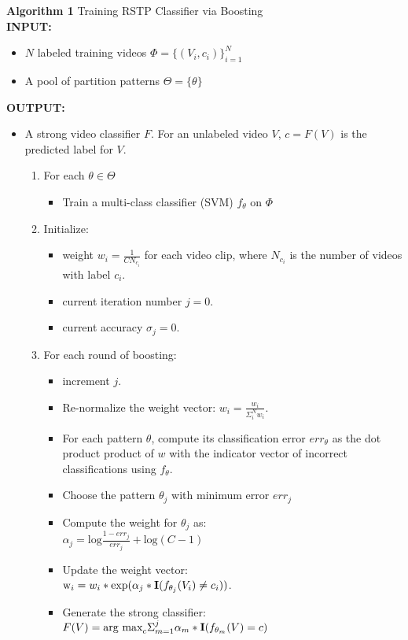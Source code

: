 \documentclass[10pt,twocolumn,letterpaper]{article}
\begin{document}
	\textbf{Algorithm 1} Training RSTP Classifier via Boosting \\
	\textbf{INPUT:} 
	\begin{itemize}
		\item $N$ labeled training videos $\Phi = \{(V_i, c_i)\}_{i=1}^N$
		\item A pool of partition patterns $\Theta = \{\theta\}$
	\end{itemize}
	\textbf{OUTPUT:}
	\begin{itemize}
		\item A strong video classifier $F$. For an unlabeled video $V$, 
			$c=F(V)$ is the predicted label for $V$.
			\begin{enumerate}

				\item For each $\theta \in \Theta$
					\begin{itemize}
						\item Train a multi-class classifier (SVM) $f_\theta$ on $\Phi$
					\end{itemize}

				\item Initialize:
					\begin{itemize}
						\item weight $w_i = \frac{1}{C N_{c_i}}$ for each video clip,
							where $N_{c_i}$ is the number of videos with label $c_i$.
						\item current iteration number $j=0$.
						\item current accuracy $\sigma_j = 0$.
					\end{itemize}

				\item For each round of boosting:
					\begin{itemize}
						\item increment $j$.
						\item Re-normalize the weight vector: $w_i = \frac{w_i}{\Sigma_i^N w_i}$.
					  \item For each pattern $\theta$, compute its classification
							error $err_\theta$ as the dot product product of $w$ with the indicator
							vector of incorrect classifications using $f_\theta$. 
						\item Choose the pattern $\theta_j$ with minimum error $err_j$
						\item Compute the weight for $\theta_j$ as: \\
							$\alpha_j = \mbox{log} \frac{1 - err_j}{err_j} + \mbox{log}(C
							- 1)$
						\item Update the weight vector:\\
							$\mbox w_i = w_i * \mbox{exp}(\alpha_j *
							\mbox{\textbf{I}}(f_{\theta_j}(V_i) \neq c_i))$.
						\item Generate the strong classifier: \\
							$F(V) = \mbox{arg max}_c \Sigma_{m=1}^j \alpha_m *
							\mbox{\textbf{I}}(f_{\theta_m}(V) = c)$
					\end{itemize}

			\end{enumerate}
	\end{itemize}
	
\end{document}
